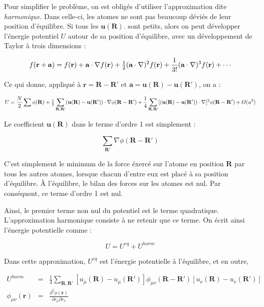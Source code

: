 Pour simplifier le problème, on est obligés d'utiliser l'approximation dite
\emph{harmonique}. Dans celle-ci, les atomes ne sont pas beaucoup déviés de leur
position d'équilibre. Si tous les $\mathbf{u(R)}$. sont petits, alors on peut
développer l'énergie potentiel $U$ autour de sa position d'équilibre, avec
un développement de Taylor à trois dimensions :

\begin{equation}
    f(\mathbf{r+a}) = f(\mathbf{r}) + \mathbf{a \cdot \nabla}f(\mathbf{r}) + \half (\mathbf{a\cdot\nabla})^2 f(\mathbf{r}) + \frac{1}{3!}
    (\mathbf{a \cdot \nabla})^3 f(\mathbf{r}) + \cdots
    \label{taylor}
\end{equation}

Ce qui donne, appliqué à $\mathbf{r=R-R'}$ et $\mathbf{a = u(R) - u(R')}$, on a :

\begin{equation}
    U = \frac{N}{2} \sum \phi(\mathbf{R}) + \mbox{$\frac{1}{2}$} \sum_{\mathbf{R,R'}} (\mathbf{u(R) - u(R')}) \cdot \mathbf{\nabla} \phi(\mathbf{R-R'}) +
    \frac{1}{4} \sum_{\mathbf{R,R'}} [(\mathbf{u(R)-u(R'))\cdot\nabla}]^2 \phi(\mathbf{R-R'}) + O(u^3)
    \label{taylorpot}
\end{equation}

Le coefficient $\mathbf{u(R)}$ dans le terme d'ordre 1 est simplement :

\begin{equation}
    \sum_{\mathbf{R'}} \nabla \phi(\mathbf{R-R'})
    \label{coeflineaireapproxharmh}
 \end{equation}

C'est simplement le minimum de la force éxercé sur l'atome en position
$\mathbf{R}$  par tous les autres atomes, lorsque chacun d'entre eux est placé
à sa position d'équilibre. À l'équilibre, le bilan des forces sur les atomes
est nul. Par conséquent, ce terme d'ordre 1 est nul.

Ainsi, le premier terme non nul du potentiel est le terme quadratique.
L'approximation harmonique consiste à ne retenir que ce terme. On écrit ainsi
l'énergie potentielle comme :

\begin{equation}
    U = U^{eq} + U^{harm}
    \label{approxharm}
\end{equation}
 
Dans cette approximation, $U^{eq}$ est l'énergie potentielle à l'équilibre, et
en outre,

\begin{eqnarray}
    U^{harm} &  = &  \frac{1}{4} \sum_{\mathbf{R,R'}} [u_\mu(\mathbf{R}) - u_\mu(\mathbf{R'})] \phi_{\mu\nu}(\mathbf{R-R'})[u_\nu(\mathbf{R}) -
    u_\nu(\mathbf{R'})] \\
    \phi_{\mu\nu}(\mathbf{r}) & = & \frac{\partial^2 \phi(\mathbf{r})}{\partial r_\mu \partial r_\nu}
    \label{uharm}
\end{eqnarray}

